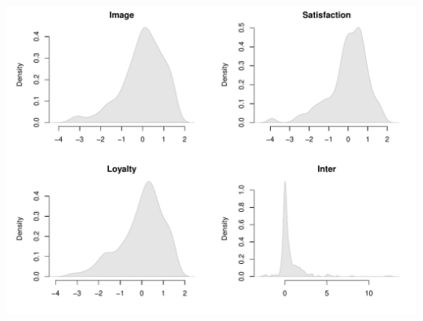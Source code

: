 \documentclass[12pt]{book}\usepackage{graphicx, color}
\newenvironment{knitrout}{}{} %
\begin{document}
\begin{knitrout}
\color{fgcolor}

{\centering \includegraphics[width=.95\linewidth,height=.6\linewidth]{figure/TwoStageApp1_distr_plot} 

}



\end{knitrout}
\end{document}
